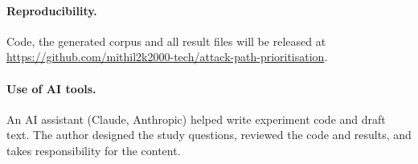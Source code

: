 \documentclass[11pt]{article}
\begin{document}
\paragraph{Reproducibility.} Code, the generated corpus and all result files will be released at
\url{https://github.com/mithil2k2000-tech/attack-path-prioritisation}.

\paragraph{Use of AI tools.} An AI assistant (Claude, Anthropic) helped write experiment code and draft text. The author designed the study
questions, reviewed the code and results, and takes responsibility for the content.



\end{document}
